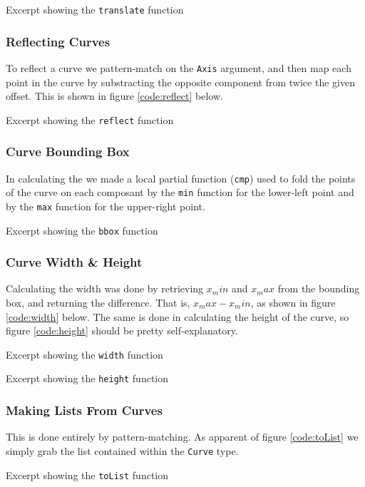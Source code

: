 {Excerpt showing the {\tt translate} function}


\subsubsection{Reflecting Curves}
To reflect a curve we pattern-match on the {\tt Axis} argument, and then map
each point in the curve by substracting the opposite component from twice the
given offset. This is shown in figure \ref{code:reflect} below.

{Excerpt showing the {\tt reflect} function}


\subsubsection{Curve Bounding Box}
In calculating the we made a local partial function ({\tt cmp}) used to fold
the points of the curve on each composant by the {\tt min} function for the
lower-left point and by the {\tt max} function for the upper-right point.

{Excerpt showing the {\tt bbox} function}


\subsubsection{Curve Width \& Height}
Calculating the width was done by retrieving $x_min$ and $x_max$ from the
bounding box, and returning the difference. That is, $x_max - x_min$, as shown
in figure \ref{code:width} below. The same is done in calculating the height
of the curve, so figure \ref{code:height} should be pretty self-explanatory.

\begin{multicols}{2}

    {Excerpt showing the {\tt width} function}

    \columnbreak

    {Excerpt showing the {\tt height} function}

\end{multicols}

\subsubsection{Making Lists From Curves}
This is done entirely by pattern-matching. As apparent of figure
\ref{code:toList} we simply grab the list contained within the {\tt Curve}
type.

{Excerpt showing the {\tt toList} function}

